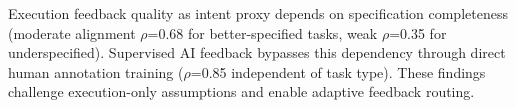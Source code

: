 Execution feedback quality as intent proxy depends on specification completeness (moderate alignment $\rho$=0.68 for better-specified tasks, weak $\rho$=0.35 for underspecified). Supervised AI feedback bypasses this dependency through direct human annotation training ($\rho$=0.85 independent of task type). These findings challenge execution-only assumptions and enable adaptive feedback routing.
